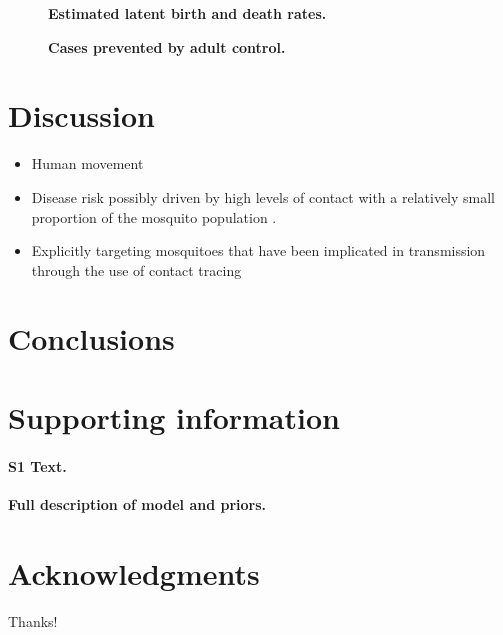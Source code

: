 \documentclass[10pt,letterpaper]{article}
\begin{document}
\begin{figure}[!h]
\caption{{\bf Estimated latent birth and death rates.}
}
\label{latent}
\end{figure}

\begin{figure}[!h]
\caption{{\bf Cases prevented by adult control.}
}
\label{adultcontrol}
\end{figure}

\section*{Discussion}

\begin{itemize}
\item Human movement \cite{Adams2009, Cosner2009a, Stoddard2009, Dalziel2013}
\item Disease risk possibly driven by high levels of contact with a relatively small proportion of the mosquito population \cite{Canyon1999}.
\item Explicitly targeting mosquitoes that have been implicated in transmission through the use of contact tracing \cite{Vazquez-Prokopec2017}
\end{itemize}

\section*{Conclusions}

\section*{Supporting information}

\paragraph*{S1 Text.}
\label{S1_Diag}
{\bf Full description of model and priors.}

\section*{Acknowledgments}

Thanks!

\nolinenumbers

%
%
% 



\end{document}
